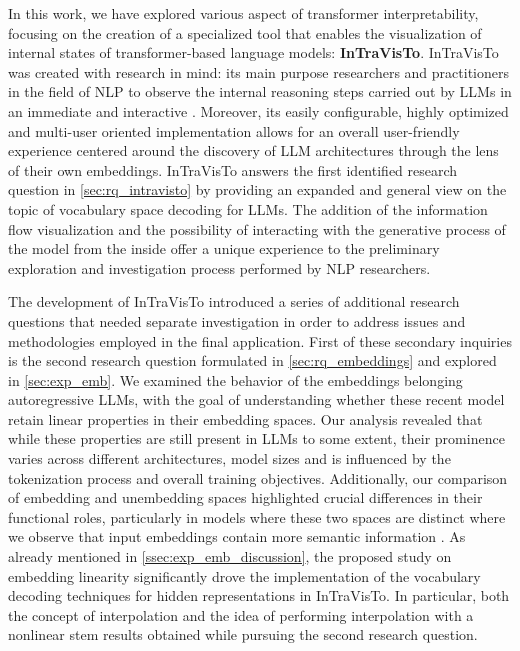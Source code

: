 In this work, we have explored various aspect of transformer interpretability, focusing on the creation of a specialized tool that enables the visualization of internal states of transformer-based language models: \textbf{InTraVisTo}.
InTraVisTo was created with research in mind: its main purpose  researchers and practitioners in the field of NLP to observe the internal reasoning steps carried out by LLMs in an immediate and interactive .
Moreover, its easily configurable, highly optimized and multi-user oriented implementation allows for an overall user-friendly experience centered around the discovery of LLM architectures through the lens of their own embeddings.
InTraVisTo answers the first identified research question in \cref{sec:rq_intravisto} by providing an expanded and general view on the topic of vocabulary space decoding for LLMs.
The addition of the information flow visualization and the possibility of interacting with the generative process of the model from the inside offer a unique experience  to the preliminary exploration and investigation process performed by NLP researchers.

The development of InTraVisTo introduced a series of additional research questions that needed separate investigation in order to address  issues and  methodologies employed in the final application.
First of these secondary inquiries is the second research question formulated in \cref{sec:rq_embeddings} and explored in \cref{sec:exp_emb}.
We examined the behavior of the embeddings belonging autoregressive LLMs, with the  goal of understanding whether these recent model retain linear properties in their embedding spaces.
Our analysis revealed that while these properties are still present in LLMs to some extent, their prominence varies across different architectures, model sizes and is  influenced by the tokenization process and overall training objectives.
Additionally, our comparison of embedding and unembedding spaces highlighted crucial differences in their functional roles, particularly in models where these two spaces are distinct where we observe that input embeddings contain more semantic information .
As already mentioned in \cref{ssec:exp_emb_discussion}, the proposed study on embedding linearity significantly drove the implementation of the vocabulary decoding techniques for hidden representations in InTraVisTo.
In particular, both the concept of interpolation and the idea of performing interpolation with a nonlinear  stem results obtained while pursuing the second research question.

